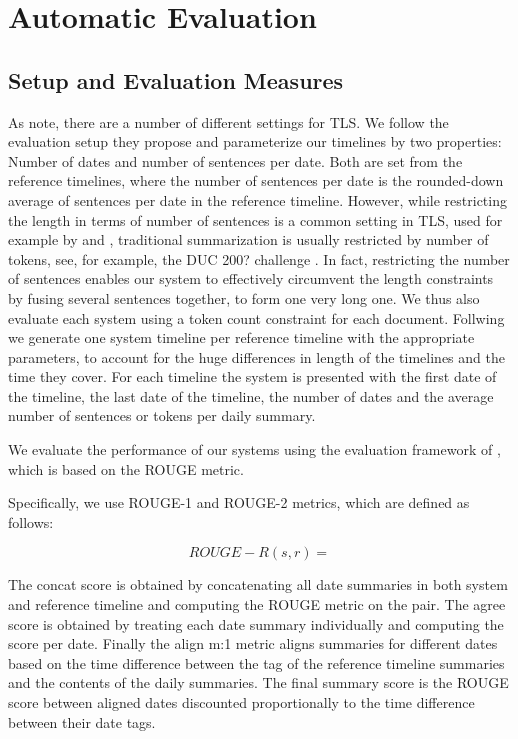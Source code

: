 \documentclass[a4paper,BCOR=10mm]{report}
\begin{document}
\chapter{Automatic Evaluation}

\section{Setup and Evaluation Measures}

As \citet{markert} note, there are a number of different settings for TLS.
We follow the evaluation setup they propose and parameterize our timelines by two properties: Number of dates and number of sentences per date. Both are set from the reference timelines, where the number of sentences per date is the rounded-down average of sentences per date in the reference timeline.
However, while restricting the length in terms of number of sentences is a common setting in TLS, used for example by \citet{chieu} and \citet{yan-trans}, traditional summarization is usually restricted by number of tokens, see, for example, the DUC 200? challenge \citep{duc200?}. In fact, restricting the number of sentences enables our system to effectively circumvent the length constraints by fusing several sentences together, to form one very long one.
We thus also evaluate each system using a token count constraint for each document.
Follwing \citeauthor{markert} we generate one system timeline per reference timeline with the appropriate parameters, to account for the huge differences in length of the timelines and the time they cover. For each timeline the system is presented with the first date of the timeline, the last date of the timeline, the number of dates and the average number of sentences or tokens per daily summary.

We evaluate the performance of our systems using the evaluation framework of \citet{tilse}, which is based on the ROUGE \citep{rouge} metric.

Specifically, we use ROUGE-1 and ROUGE-2 metrics, which are defined as follows:

\begin{displaymath}
    ROUGE-R(s, r) = 
\end{displaymath}

The concat score is obtained by concatenating all date summaries in both system and reference timeline and computing the ROUGE metric on the pair.
The agree score is obtained by treating each date summary individually and computing the score per date.
Finally the align m:1 metric aligns summaries for different dates based on the time difference between the tag of the reference timeline summaries and the contents of the daily summaries. The final summary score is the ROUGE score between aligned dates discounted proportionally to the time difference between their date tags.
\end{document}
